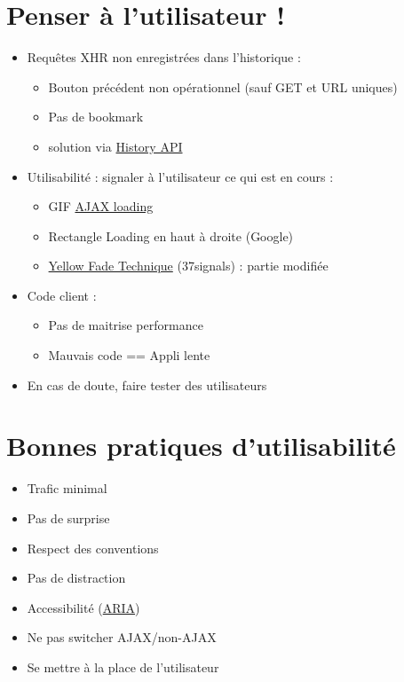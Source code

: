 \hypertarget{penser-uxe0-lutilisateur}{%
\section{Penser à l'utilisateur !}\label{penser-uxe0-lutilisateur}}

\begin{itemize}
\tightlist
\item
  Requêtes XHR non enregistrées dans l'historique :

  \begin{itemize}
  \tightlist
  \item
    Bouton précédent non opérationnel (sauf GET et URL uniques)
  \item
    Pas de bookmark
  \item
    solution via
    \href{http://w3c.github.io/html/browsers.html\#session-history-and-navigation}{History
    API}
  \end{itemize}
\item
  Utilisabilité : signaler à l'utilisateur ce qui est en cours :

  \begin{itemize}
  \tightlist
  \item
    GIF \href{http://www.ajaxload.info/}{AJAX loading}
  \item
    Rectangle Loading en haut à droite (Google)
  \item
    \href{https://signalvnoise.com/archives/000558.php}{Yellow Fade
    Technique} (37signals) : partie modifiée
  \end{itemize}
\item
  Code client :

  \begin{itemize}
  \tightlist
  \item
    Pas de maitrise performance
  \item
    Mauvais code == Appli lente
  \end{itemize}
\item
  En cas de doute, faire tester des utilisateurs
\end{itemize}

\hypertarget{bonnes-pratiques-dutilisabilituxe9}{%
\section{Bonnes pratiques
d'utilisabilité}\label{bonnes-pratiques-dutilisabilituxe9}}

\begin{itemize}
\tightlist
\item
  Trafic minimal
\item
  Pas de surprise
\item
  Respect des conventions
\item
  Pas de distraction
\item
  Accessibilité
  (\href{https://developer.mozilla.org/en-US/docs/Web/Accessibility/ARIA}{ARIA})
\item
  Ne pas switcher AJAX/non-AJAX
\item
  Se mettre à la place de l'utilisateur
\end{itemize}

